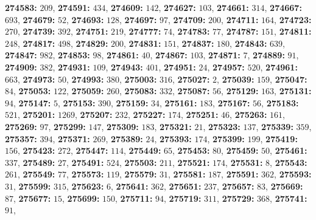 \textsf{\bfseries 274583:} $209$, \textsf{\bfseries 274591:} $434$, \textsf{\bfseries 274609:} $142$, \textsf{\bfseries 274627:} $103$, \textsf{\bfseries 274661:} $314$, \textsf{\bfseries 274667:} $693$, \textsf{\bfseries 274679:} $52$, \textsf{\bfseries 274693:} $128$, \textsf{\bfseries 274697:} $97$, \textsf{\bfseries 274709:} $200$, \textsf{\bfseries 274711:} $164$, \textsf{\bfseries 274723:} $270$, \textsf{\bfseries 274739:} $392$, \textsf{\bfseries 274751:} $219$, \textsf{\bfseries 274777:} $74$, \textsf{\bfseries 274783:} $77$, \textsf{\bfseries 274787:} $151$, \textsf{\bfseries 274811:} $248$, \textsf{\bfseries 274817:} $498$, \textsf{\bfseries 274829:} $200$, \textsf{\bfseries 274831:} $151$, \textsf{\bfseries 274837:} $180$, \textsf{\bfseries 274843:} $639$, \textsf{\bfseries 274847:} $982$, \textsf{\bfseries 274853:} $98$, \textsf{\bfseries 274861:} $40$, \textsf{\bfseries 274867:} $103$, \textsf{\bfseries 274871:} $7$, \textsf{\bfseries 274889:} $91$, \textsf{\bfseries 274909:} $382$, \textsf{\bfseries 274931:} $109$, \textsf{\bfseries 274943:} $401$, \textsf{\bfseries 274951:} $24$, \textsf{\bfseries 274957:} $520$, \textsf{\bfseries 274961:} $663$, \textsf{\bfseries 274973:} $50$, \textsf{\bfseries 274993:} $380$, \textsf{\bfseries 275003:} $316$, \textsf{\bfseries 275027:} $2$, \textsf{\bfseries 275039:} $159$, \textsf{\bfseries 275047:} $84$, \textsf{\bfseries 275053:} $122$, \textsf{\bfseries 275059:} $260$, \textsf{\bfseries 275083:} $332$, \textsf{\bfseries 275087:} $56$, \textsf{\bfseries 275129:} $163$, \textsf{\bfseries 275131:} $94$, \textsf{\bfseries 275147:} $5$, \textsf{\bfseries 275153:} $390$, \textsf{\bfseries 275159:} $34$, \textsf{\bfseries 275161:} $183$, \textsf{\bfseries 275167:} $56$, \textsf{\bfseries 275183:} $521$, \textsf{\bfseries 275201:} $1269$, \textsf{\bfseries 275207:} $232$, \textsf{\bfseries 275227:} $174$, \textsf{\bfseries 275251:} $46$, \textsf{\bfseries 275263:} $161$, \textsf{\bfseries 275269:} $97$, \textsf{\bfseries 275299:} $147$, \textsf{\bfseries 275309:} $183$, \textsf{\bfseries 275321:} $21$, \textsf{\bfseries 275323:} $137$, \textsf{\bfseries 275339:} $359$, \textsf{\bfseries 275357:} $394$, \textsf{\bfseries 275371:} $269$, \textsf{\bfseries 275389:} $24$, \textsf{\bfseries 275393:} $174$, \textsf{\bfseries 275399:} $199$, \textsf{\bfseries 275419:} $156$, \textsf{\bfseries 275423:} $272$, \textsf{\bfseries 275447:} $114$, \textsf{\bfseries 275449:} $65$, \textsf{\bfseries 275453:} $80$, \textsf{\bfseries 275459:} $50$, \textsf{\bfseries 275461:} $337$, \textsf{\bfseries 275489:} $27$, \textsf{\bfseries 275491:} $524$, \textsf{\bfseries 275503:} $211$, \textsf{\bfseries 275521:} $174$, \textsf{\bfseries 275531:} $8$, \textsf{\bfseries 275543:} $261$, \textsf{\bfseries 275549:} $77$, \textsf{\bfseries 275573:} $119$, \textsf{\bfseries 275579:} $31$, \textsf{\bfseries 275581:} $187$, \textsf{\bfseries 275591:} $362$, \textsf{\bfseries 275593:} $31$, \textsf{\bfseries 275599:} $315$, \textsf{\bfseries 275623:} $6$, \textsf{\bfseries 275641:} $362$, \textsf{\bfseries 275651:} $237$, \textsf{\bfseries 275657:} $83$, \textsf{\bfseries 275669:} $87$, \textsf{\bfseries 275677:} $15$, \textsf{\bfseries 275699:} $150$, \textsf{\bfseries 275711:} $94$, \textsf{\bfseries 275719:} $311$, \textsf{\bfseries 275729:} $368$, \textsf{\bfseries 275741:} $91$, 
